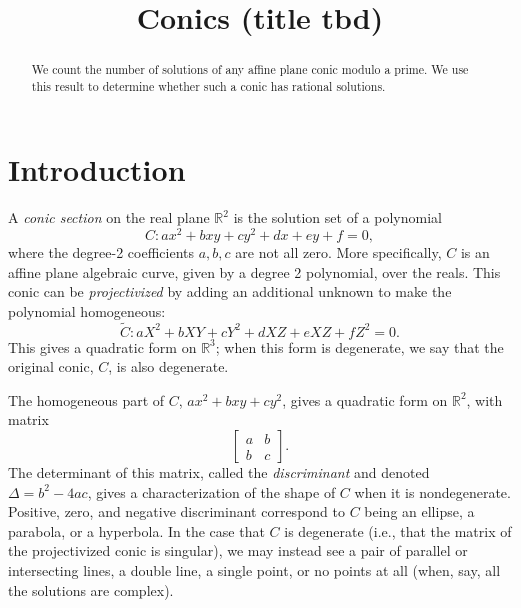 \documentclass[10pt,a4paper]{amsart}
\numberwithin{equation}{section}
\numberwithin{figure}{section}
\theoremstyle{definition}
\theoremstyle{remark}
\theoremstyle{plain}
\theoremstyle{plain}
\theoremstyle{definition}
\theoremstyle{plain}
\theoremstyle{plain}
\newcommand{\R}{\mathbb{R}}
\begin{document}
 

    \title{Conics (title tbd)} 

    \maketitle

    \begin{abstract} 
        We count the number of solutions of any affine plane conic modulo a prime.
        We use this result to determine whether such a conic has rational solutions. 
    \end{abstract}

    \tableofcontents

    \section{Introduction} 
    
    A \emph{conic section} on the real plane $\R^2$ is the solution set of 
    a polynomial
    \[ C: ax^2 + bxy + cy^2 + dx + ey + f = 0, \]
    where the degree-2 coefficients $a, b, c$ are not all zero. More specifically,
    $C$ is an affine plane algebraic curve, given by a degree 2 polynomial, over
    the reals. This conic can be \emph{projectivized} by adding an additional
    unknown to make the polynomial homogeneous:
    \[ \widetilde{C}: aX^2 + bXY + cY^2 + dXZ + eXZ + fZ^2 = 0. \]
    This gives a quadratic form on $\R^3$; when this form is degenerate, we
    say that the original conic, $C$, is also degenerate.
    
    The homogeneous part of $C$, $ax^2 + bxy + cy^2$, gives a quadratic form
    on $\R^2$, with matrix
    \[ \begin{bmatrix}
        a & b \\
        b & c
    \end{bmatrix}. \]
    The determinant of this matrix, called the \emph{discriminant} and
    denoted $\Delta = b^2 - 4ac$, gives a characterization of the shape of $C$
    when it is nondegenerate. Positive, zero, and negative discriminant
    correspond to $C$ being an ellipse, a parabola, or a hyperbola. In the
    case that $C$ is degenerate (i.e., that the matrix of the projectivized
    conic is singular), we may instead see a pair of parallel or intersecting 
    lines, a double line, a single point, or no points at all (when, say,
    all the solutions are complex).
    
\end{document}
